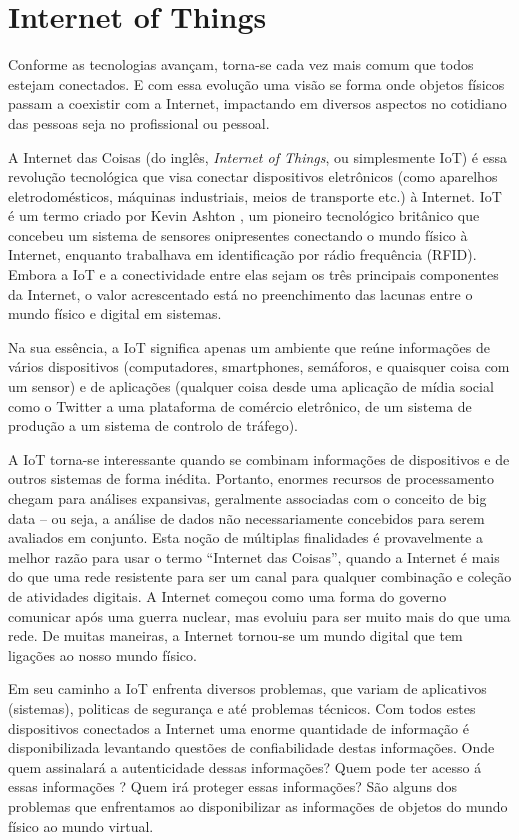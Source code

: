 \section{Internet of Things}
\label{sec:iot}

Conforme as tecnologias avançam, torna-se cada vez mais comum que todos estejam conectados. E com essa evolução uma visão se forma onde objetos físicos passam a coexistir com a Internet, impactando em diversos aspectos no cotidiano das pessoas seja no profissional ou pessoal.

A Internet das Coisas (do inglês, \textit{Internet of Things}, ou simplesmente IoT) é essa revolução tecnológica que visa conectar dispositivos eletrônicos (como aparelhos eletrodomésticos, máquinas industriais, meios de transporte etc.) à Internet. IoT é um termo criado por Kevin Ashton \cite{Kevin}, um pioneiro tecnológico britânico que concebeu um sistema de sensores onipresentes conectando o mundo físico à Internet, enquanto trabalhava em identificação por rádio frequência (RFID). Embora a IoT e a conectividade entre elas sejam os três principais componentes da Internet, o valor acrescentado está no preenchimento das lacunas entre o mundo físico e digital em sistemas.

Na sua essência, a IoT significa apenas um ambiente que reúne informações de vários dispositivos (computadores, smartphones, semáforos, e quaisquer coisa com um sensor) e de aplicações (qualquer coisa desde uma aplicação de mídia social como o Twitter a uma plataforma de comércio eletrônico, de um sistema de produção a um sistema de controlo de tráfego).

A IoT torna-se interessante quando se combinam informações de dispositivos e de outros sistemas de forma inédita. Portanto, enormes recursos de processamento chegam para análises expansivas, geralmente associadas com o conceito de big data – ou seja, a análise de dados não necessariamente concebidos para serem avaliados em conjunto. Esta noção de múltiplas finalidades é provavelmente a melhor razão para usar o termo “Internet das Coisas”, quando a Internet é mais do que uma rede resistente para ser um canal para qualquer combinação e coleção de atividades digitais. A Internet começou como uma forma do governo comunicar após uma guerra nuclear, mas evoluiu para ser muito mais do que uma rede. De muitas maneiras, a Internet tornou-se um mundo digital que tem ligações ao nosso mundo físico.

Em seu caminho a IoT enfrenta diversos problemas, que variam de aplicativos (sistemas), politicas de segurança e até problemas técnicos. Com todos estes dispositivos conectados a Internet uma enorme quantidade de informação é disponibilizada levantando questões de confiabilidade destas informações. Onde quem assinalará a autenticidade dessas informações? Quem pode ter acesso á essas informações ? Quem irá proteger essas informações? São alguns dos problemas que enfrentamos ao disponibilizar as informações de objetos do mundo físico ao mundo virtual.

